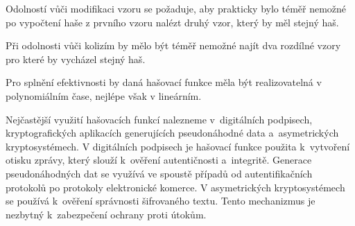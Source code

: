 Odolností vůči modifikaci vzoru se požaduje, aby prakticky bylo téměř nemožné po %
vypočtení haše z prvního vzoru nalézt druhý vzor, který by měl stejný haš.

Při odolnosti vůči kolizím by mělo být téměř nemožné najít dva rozdílné vzory pro které by vycházel stejný haš.\cite{Burda9788021446120ISBN} %

Pro splnění efektivnosti by daná hašovací funkce měla být realizovatelná v polynomiálním čase, nejlépe však v lineárním.\cite{Mao0130669431ISBN} %

Nejčastější využití hašovacích funkcí nalezneme v~digitálních podpisech, kryptografických aplikacích generujících pseudonáhodné data a~asymetrických kryptosystémech. V digitálních podpisech je hašovací funkce použita k~vytvoření otisku zprávy, který slouží k~ověření autentičnosti a~integritě. Generace pseudonáhodných dat se využívá ve spoustě případů od autentifikačních protokolů po protokoly elektronické komerce. V asymetrických kryptosystémech se používá k~ověření správnosti šifrovaného textu. Tento mechanizmus je nezbytný k~zabezpečení ochrany proti útokům.\cite{Mao0130669431ISBN}%
